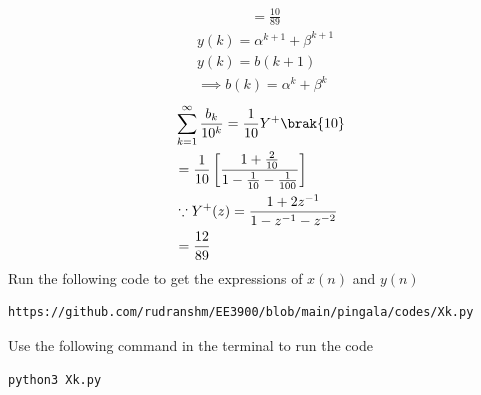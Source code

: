 \documentclass[journal,12pt,twocolumn]{IEEEtran}
\renewcommand\thesection{\arabic{section}}
\begin{document}
\begin{enumerate}[label=\thesection.\arabic*,ref=\thesection.\theenumi]
\begin{align}
&=\frac{10}{89}
\end{align}
\begin{align}
&y(k)=\alpha^{k+1}+\beta^{k+1}\\
&y(k)=b(k+1)\\
&\implies b(k)=\alpha^{k}+\beta^{k}
\end{align}
\begin{align}
&\sum_{k=1}^{\infty}\frac{b_k}{10^k} =\frac{1}{10}Y^{+}\brak{{10}}\\
&=\frac{1}{10}\left[\frac{1+\frac{2}{10}}{1-\frac{1}{10}-\frac{1}{100}}\right]\\
&\because Y^{+}(z)=\frac{1+2z^{-1}}{1-z^{-1}-z^{-2}}\\
&=\frac{12}{89}
\end{align}
Run the following code to get the expressions of $x(n)$ and $y(n)$
\begin{lstlisting}
https://github.com/rudranshm/EE3900/blob/main/pingala/codes/Xk.py
\end{lstlisting}
Use the following command in the terminal to run the code
\begin{lstlisting}
python3 Xk.py
\end{lstlisting}
\end{enumerate}
\end{document}
